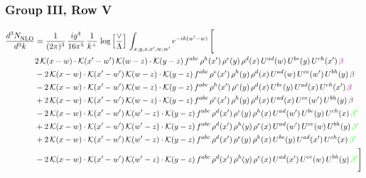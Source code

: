 \documentclass[9pt]{article}
\numberwithin{equation}{section}
\begin{document}
\subsubsection{Group III, Row V}     
\begin{align}
     \frac{d^{3}N_{\rm NLO}^{\rm}}{d^{3}k}  & = \frac{1}{(2\pi)^{3}}\, \frac{ig^{4}}{16\pi^{5}}\, \frac{1}{k^{+}}\, \log{\left[\frac{\vee}{\Lambda}\right]}\, \int_{x,y,z,x^{\prime},w,w^{\prime}}e^{-ik(w^{\prime}-w)}\, \Bigg[\notag \\ & 2\,\mathcal{K}(x-w)\cdot\mathcal{K}(x'-w')\,\mathcal{K}(w-z)\cdot\mathcal{K}(y-z)\, f^{abc}\,\rho^{h}(x')\,\rho^{e}(y)\,\rho^{d}(x)\,U^{ad}(w)\,U^{be}(y)\,U^{ch}(x')\,{\color{violet}\beta}\notag\\ &-2\,\mathcal{K}(x-w)\cdot\mathcal{K}(x'-w')\,\mathcal{K}(w-z)\cdot\mathcal{K}(y-z)\, f^{abc}\,\rho^{e}(x')\,\rho^{h}(y)\,\rho^{d}(x)\,U^{ad}(w)\,U^{ce}(w')\,U^{bh}(y)\,{\color{violet}\beta} \notag\\ & -2\,\mathcal{K}(x-w)\cdot\mathcal{K}(x'-w')\,\mathcal{K}(w-z)\cdot\mathcal{K}(y-z)\, f^{abc}\,\rho^{h}(x')\,\rho^{e}(y)\,\rho^{d}(x)\,U^{be}(y)\,U^{ad}(x)\,U^{ch}(x')\,{\color{violet}\beta} \notag\\ &+2\,\mathcal{K}(x-w)\cdot\mathcal{K}(x'-w')\,\mathcal{K}(w-z)\cdot\mathcal{K}(y-z)\, f^{abc}\,\rho^{e}(x')\,\rho^{h}(y)\,\rho^{d}(x)\,U^{ad}(x)\,U^{ce}(w')\,U^{bh}(y)\,{\color{violet}\beta}\notag \\ & -2\, \mathcal{K}(x-w) \cdot \mathcal{K}(x'-w')\, \mathcal{K}(w'-z) \cdot \mathcal{K}(y-z)\, f^{abc}\, \rho^{d}(x')\,\rho^{e}(y)\, \rho^{h}(x)\,U^{ad}(w')\,U^{be}(y)\,U^{ch}(x)\, {\color{green} \beta'}\notag \\ & + 2\, \mathcal{K}(x-w) \cdot \mathcal{K}(x'-w')\, \mathcal{K}(w'-z) \cdot \mathcal{K}(y-z)\, f^{abc}\, \rho^{d}(x')\,\rho^{h}(y)\, \rho^{e}(x)\,U^{ad}(w')\,U^{ce}(w)\,U^{bh}(y)\, {\color{green} \beta'}\notag \\ & +2\, \mathcal{K}(x-w) \cdot \mathcal{K}(x'-w')\, \mathcal{K}(w'-z) \cdot \mathcal{K}(y-z)\, f^{abc}\, \rho^{d}(x')\,\rho^{e}(y)\, \rho^{h}(x)\,U^{be}(y)\,U^{ad}(x')\,U^{ch}(x)\, {\color{green} \beta'}\notag \\ & -2\, \mathcal{K}(x-w) \cdot \mathcal{K}(x'-w')\, \mathcal{K}(w'-z) \cdot \mathcal{K}(y-z)\, f^{abc}\, \rho^{d}(x')\,\rho^{h}(y)\, \rho^{e}(x)\,U^{ad}(x')\,U^{ce}(w)\,U^{bh}(y)\, {\color{green} \beta'}\Bigg]
     \end{align} 
\end{document}
